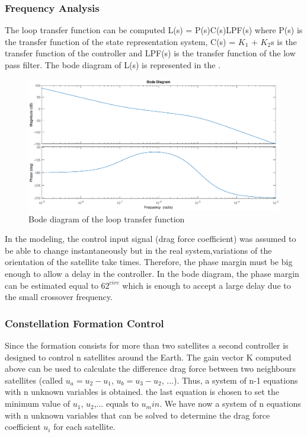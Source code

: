 \subsubsection{Frequency Analysis}
The loop transfer function can be computed L(s) = P(s)C(s)LPF(s) where P(s) is the transfer function of the state representation system, C(s) = $K_1$ + $K_2$s is the transfer function of the controller and LPF(s) is the transfer function of the low pass filter.
The bode diagram of L(s) is represented in the . \\
\begin{figure}[H]
	\centering
	\includegraphics[width=0.9\linewidth]
	{figures/Bode_L.eps}
	\caption{Bode diagram of the loop transfer function}
	\label{fig:Bode_L}
\end{figure}
In the modeling, the control input signal (drag force coefficient) was assumed to be able to change instantaneously but in the real system,variations of the orientation of the satellite take times. Therefore, the phase margin must be big enough to allow a delay in the controller. In the bode diagram, the phase margin can be estimated equal to $62^{circ}$ which is enough to accept a large delay due to the small crossover frequency. \\

\subsubsection{Constellation Formation Control} 
Since the formation consists for more than two satellites a second controller is designed to control n satellites around the Earth. The gain vector K computed above can be used to calculate the difference drag force between two neighbours satellites (called $u_a = u_2 - u_1$, $u_b = u_3 - u_2$, ...). Thus, a system of n-1 equations with n unknown variables is obtained. the last equation is chosen to set the minimum value of $u_1$, $u_2$,... equals to $u_min$. We have now a system of n equations with n unknown variables that can be solved to determine the drag force coefficient $u_i$ for each satellite.
%
